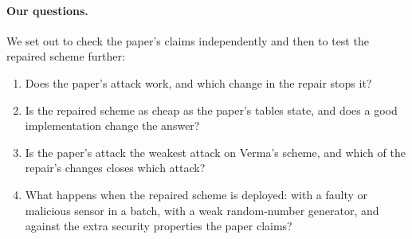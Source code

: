 \paragraph{Our questions.}
We set out to check the paper's claims independently and then to test the repaired scheme further:
\begin{enumerate}[label=\textbf{RQ\arabic*}]
\item Does the paper's attack work, and which change in the repair stops it?
\item Is the repaired scheme as cheap as the paper's tables state, and does a good implementation change
      the answer?
\item Is the paper's attack the weakest attack on Verma's scheme, and which of the repair's changes closes
      which attack?
\item What happens when the repaired scheme is deployed: with a faulty or malicious sensor in a batch,
      with a weak random-number generator, and against the extra security properties the paper claims?
\end{enumerate}


